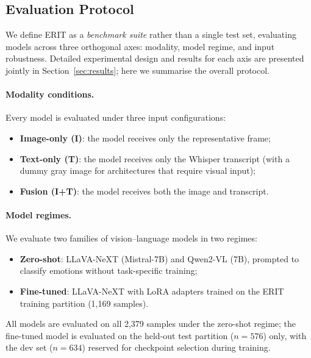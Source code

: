 
\subsection{Evaluation Protocol}
\label{sec:protocol}

We define ERIT as a \emph{benchmark suite} rather than a single test set,
evaluating models across three orthogonal axes: modality, model regime, and
input robustness.  Detailed experimental design and results for each axis
are presented jointly in Section~\ref{sec:results}; here we summarise the
overall protocol.

\paragraph{Modality conditions.}
Every model is evaluated under three input configurations:
\begin{itemize}[nosep]
  \item \textbf{Image-only (I)}: the model receives only the representative
        frame;
  \item \textbf{Text-only (T)}: the model receives only the Whisper
        transcript (with a dummy gray image for architectures that require
        visual input);
  \item \textbf{Fusion (I+T)}: the model receives both the image and
        transcript.
\end{itemize}

\paragraph{Model regimes.}
We evaluate two families of vision--language models in two regimes:
\begin{itemize}[nosep]
  \item \textbf{Zero-shot}: LLaVA-NeXT (Mistral-7B) and Qwen2-VL (7B),
        prompted to classify emotions without task-specific training;
  \item \textbf{Fine-tuned}: LLaVA-NeXT with LoRA adapters trained on
        the ERIT training partition (1{,}169 samples).
\end{itemize}

\noindent All models are evaluated on all 2{,}379 samples under the
zero-shot regime; the fine-tuned model is evaluated on the held-out test
partition ($n\!=\!576$) only, with the dev set ($n\!=\!634$) reserved for
checkpoint selection during training.


